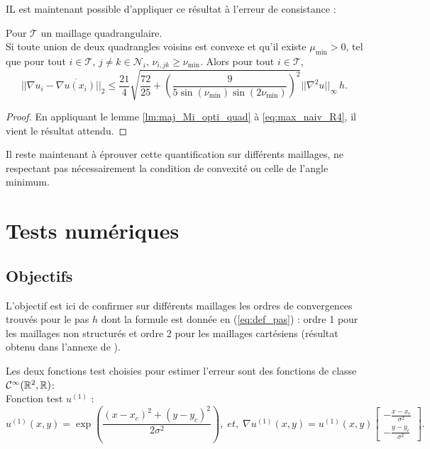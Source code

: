 \documentclass[12pt,a4paper]{article}
\begin{document}
	IL est maintenant possible d'appliquer ce résultat à l'erreur de consistance :
	
	\begin{thm}\label{thm:maj_erreur_quad}
		Pour $\mathcal T$ un maillage quadrangulaire.\\
		Si toute union de deux quadrangles voisins est convexe et qu'il existe $\mu_{\min} > 0$, tel que pour tout $i \in \mathcal T$, $j \not = k \in \mathcal N_i$, $\nu_{i,jk} \geq \nu_{\min}$. Alors pour tout $i \in \mathcal T$,
		\begin{equation}
			|\!|\nabla u_i - \overline{\nabla u(x_i)}|\!|_2 \leq \frac{21}{4}\sqrt{\frac{72}{25}+\left(\frac{9}{5\sin(\nu_{\min})\sin(2\nu_{\min})}\right)^2}|\!|\nabla^2 u|\!|_\infty\, h.
		\end{equation}
	\end{thm}
	\begin{proof}
		En appliquant le lemme \ref{lm:maj_Mi_opti_quad} à \eqref{eq:max_naiv_R4}, il vient le résultat attendu.
	\end{proof}
	
	
	Il reste maintenant à éprouver cette quantification sur différents maillages, ne respectant pas nécessairement la condition de convexité ou celle de l'angle minimum.	
	
	\vspace{-.5cm}	
	
\section{Tests numériques}

\vspace{-.5cm}

\subsection{Objectifs}

\vspace{-.5cm}

L'objectif est ici de confirmer sur différents maillages les ordres de convergences trouvés pour le pas $h$ dont la formule est donnée en (\ref{eq:def_pas}) : ordre 1 pour les maillages non structurés et ordre 2 pour les maillages cartésiens (résultat obtenu dans l'annexe de \cite{florent}). 

Les deux fonctions test choisies pour estimer l'erreur sont des fonctions de classe $\mathcal C^\infty(\mathbb{R}^2,\mathbb{R})$: \\
Fonction test $u^{(1)}$ :
\[
	u^{(1)}(x,y) = \exp\left(\dfrac{(x-x_c)^2+(y-y_c)^2}{2\sigma^2}\right),\; et,\; \nabla u^{(1)}(x,y) = u^{(1)}(x,y)\begin{bmatrix}
	-\frac{x-x_c}{\sigma^2}\\
	-\frac{y-y_c}{\sigma^2}
\end{bmatrix}.
\]
\end{document}

